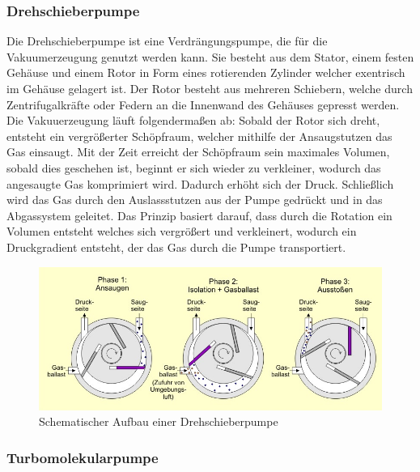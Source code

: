 \subsubsection{Drehschieberpumpe}


Die Drehschieberpumpe ist eine Verdrängungspumpe, die für die Vakuumerzeugung genutzt werden kann.
Sie besteht aus dem Stator, einem festen Gehäuse und einem Rotor in Form eines rotierenden
Zylinder welcher exentrisch im Gehäuse gelagert ist. Der Rotor besteht aus mehreren Schiebern, welche durch Zentrifugalkräfte 
oder Federn an die Innenwand des Gehäuses gepresst werden. Die Vakuuerzeugung läuft folgendermaßen ab:
Sobald der Rotor sich dreht, entsteht ein vergrößerter Schöpfraum, welcher mithilfe der Ansaugstutzen das Gas
einsaugt. Mit der Zeit erreicht der Schöpfraum sein maximales Volumen, sobald dies geschehen ist, beginnt er sich wieder zu 
verkleiner, wodurch das angesaugte Gas komprimiert wird. Dadurch erhöht sich der Druck. Schließlich wird das Gas durch den Auslassstutzen 
aus der Pumpe gedrückt und in das Abgassystem geleitet. Das Prinzip basiert darauf, dass durch die Rotation ein Volumen entsteht welches sich vergrößert 
und verkleinert, wodurch ein Druckgradient entsteht, der das Gas durch die Pumpe transportiert.

\begin{figure}
    \includegraphics[width=\textwidth]{bilder/pumpe.jpeg}
    \caption{Schematischer Aufbau einer Drehschieberpumpe}
\end{figure}


\subsubsection{Turbomolekularpumpe}

